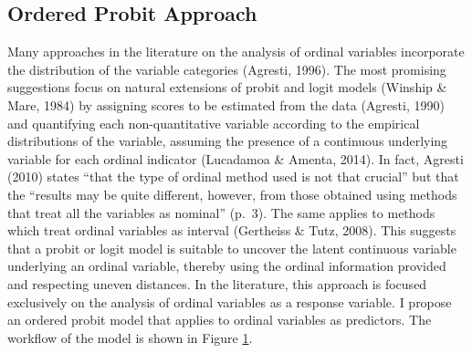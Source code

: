 \documentclass[12pt,econ]{sources/authesis}
\makeatletter
\def\caption{\refstepcounter\@captype \@dblarg{\@caption\@captype}}
\makeatother
\begin{document}
\hypertarget{ordblock-theory-op}{%
\subsection{Ordered Probit Approach}\label{ordblock-theory-op}}

Many approaches in the literature on the analysis of ordinal variables incorporate the distribution of the variable categories (Agresti, 1996). The most promising suggestions focus on natural extensions of probit and logit models (Winship \& Mare, 1984) by assigning scores to be estimated from the data (Agresti, 1990) and quantifying each non-quantitative variable according to the empirical distributions of the variable, assuming the presence of a continuous underlying variable for each ordinal indicator (Lucadamoa \& Amenta, 2014). In fact, Agresti (2010) states ``that the type of ordinal method used is not that crucial'' but that the ``results may be quite different, however, from those obtained using methods that treat all the variables as nominal'' (p.~3). The same applies to methods which treat ordinal variables as interval (Gertheiss \& Tutz, 2008). This suggests that a probit or logit model is suitable to uncover the latent continuous variable underlying an ordinal variable, thereby using the ordinal information provided and respecting uneven distances. In the literature, this approach is focused exclusively on the analysis of ordinal variables as a response variable. I propose an ordered probit model that applies to ordinal variables as predictors. The workflow of the model is shown in Figure \ref{op-workflow}.

\vspace{0.2cm}

\ssp
\begin{figure}
\centering
{}
\caption{Ordered Probit Workflow} 
\label{op-workflow}
\end{figure}
\dsp
\end{document}
